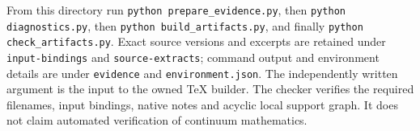 \documentclass[11pt,a4paper]{article}
\begin{document}
From this directory run \texttt{python prepare\_evidence.py}, then \texttt{python diagnostics.py}, then \texttt{python build\_artifacts.py}, and finally \texttt{python check\_artifacts.py}. Exact source versions and excerpts are retained under \texttt{input-bindings} and \texttt{source-extracts}; command output and environment details are under \texttt{evidence} and \texttt{environment.json}. The independently written argument is the input to the owned TeX builder. The checker verifies the required filenames, input bindings, native notes and acyclic local support graph. It does not claim automated verification of continuum mathematics.
\end{document}
